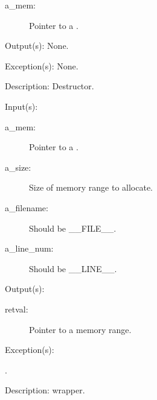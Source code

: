 \begin{capi}
\begin{capilist}
		\begin{description}\item[]
		\item[a\_mem: ]
			Pointer to a .
		\end{description}
	\item[Output(s): ] None.
	\item[Exception(s): ] None.
	\item[Description: ]
		Destructor.
	\end{capilist}
\label{mem_malloc_e}
\label{mem_malloc}
\label{cw_malloc}
	\begin{capilist}
	\item[Input(s): ]
		\begin{description}\item[]
		\item[a\_mem: ]
			Pointer to a .
		\item[a\_size: ]
			Size of memory range to allocate.
		\item[a\_filename: ]
			Should be \_\_FILE\_\_.
		\item[a\_line\_num: ]
			Should be \_\_LINE\_\_.
		\end{description}
	\item[Output(s): ]
		\begin{description}\item[]
		\item[retval: ]
			Pointer to a memory range.
		\end{description}
	\item[Exception(s): ]
		\begin{description}\item[]
		\item[.]
		\end{description}
	\item[Description: ]
		 wrapper.
	\end{capilist}
\label{mem_calloc_e}

\end{capi}

